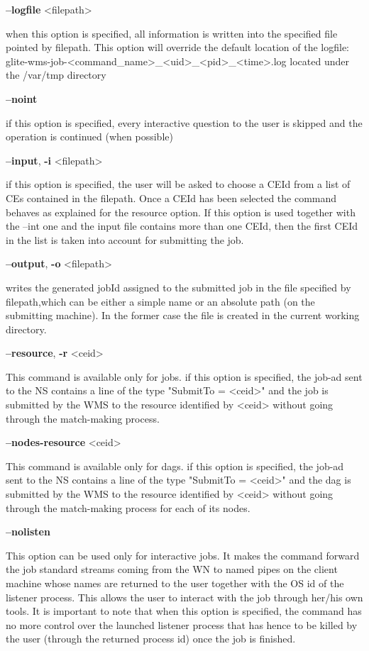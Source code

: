 {\textbf{--logfile} <filepath>

when this option is specified, all information is written into the specified file pointed by filepath.
This option will override the default location of the logfile:
glite-wms-job-<command\_name>\_<uid>\_<pid>\_<time>.log  located under the /var/tmp directory

\textbf{--noint}

if this option is specified, every interactive question to the user is skipped and the operation is continued (when possible)

\textbf{--input}, \textbf{-i} <filepath>

if this option is specified, the user will be asked to choose a CEId from a list of CEs contained in the filepath. Once a CEId has been selected the command behaves as explained for the resource option. If this option is used together with the --int one and the input file contains more than one CEId, then the first CEId in the list is taken into account for submitting the job.

\textbf{--output}, \textbf{-o} <filepath>

writes the generated jobId assigned to the submitted job in the file specified by filepath,which can be either a simple name or an absolute path (on the submitting machine). In the former case the file is created in the current working directory.

\textbf{--resource}, \textbf{-r} <ceid>

This command is available only for jobs.
if this option is specified, the job-ad sent to the NS contains a line of the type "SubmitTo = <ceid>"  and the job is submitted by the WMS to the resource identified by <ceid> without going through the match-making process.

\textbf{--nodes-resource} <ceid>

This command is available only for dags.
if this option is specified, the job-ad sent to the NS contains a line of the type "SubmitTo = <ceid>"  and the dag is submitted by the WMS to the resource identified by <ceid> without going through the match-making process for each of its nodes.

\textbf{--nolisten}

This option can be used only for interactive jobs. It makes the command forward the job standard streams coming from the WN to named pipes on the client machine whose names are returned to the user together with the OS id of the listener process. This allows the user to interact with the job through her/his own tools. It is important to note that when this option is specified, the command has no more control over the launched listener process that has hence to be killed by the user (through the returned process id) once the job is finished.

}
